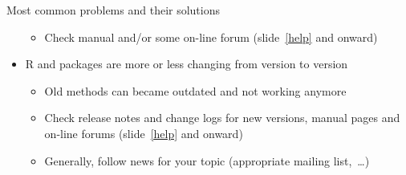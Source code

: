 \documentclass[compress, ucs, xelatex, 11pt, xcolor=svgnames,
	hyperref={
		bookmarks=true,
		unicode=true,
		colorlinks=true,
		pdftitle={Molecular data in R},
		plainpages=false,
		pdfauthor={Vojtech Zeisek},
		pdfsubject={Course about phylogeny and evolution in R},
		pdfcreator={XeLaTeX},
		pdfkeywords={R, evolution, phylogeny, molecular data},
		linkcolor=Tomato,
		anchorcolor=SaddleBrown,
		citecolor=Goldenrod,
		filecolor=DarkMagenta,
		menucolor=Sienna,
		urlcolor=DarkTurquoise,
		pdftex},
	url={hyphens, lowtilde} %
	]{beamer}
\begin{document}
\begin{frame}[allowframebreaks]{Most common problems and their solutions}
\begin{itemize}
		\begin{itemize}
			\item Check manual and/or some on-line forum (slide~\ref{help} and onward)
		\end{itemize}
		\item R and packages are more or less changing from version to version
		\begin{itemize}
			\item Old methods can became outdated and not working anymore
			\item Check release notes and change logs for new versions, manual pages and on-line forums (slide~\ref{help} and onward)
			\item Generally, follow news for your topic (appropriate mailing list,~\ldots)
		\end{itemize}
	\end{itemize}
\end{frame}
\end{document}
